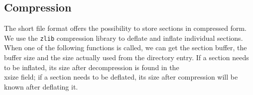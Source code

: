 

\subsection{Compression}
The short file format offers the possibility to store sections in
compressed form. We use the {\tt zlib} compression library\cite{zlib}\cite{RFC1950}
to deflate and inflate individual sections.  When one of the following
functions is called, we can get the section buffer, the buffer size
and the size actually used from the directory entry.  If a section
needs to be inflated, its size after decompression is found in the
\\{xsize} field; if a section needs to be deflated, its size after
compression will be known after deflating it.


